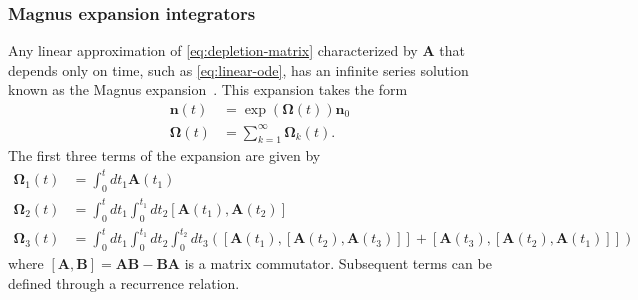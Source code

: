\documentclass[3p,authoryear]{elsarticle}
\newcommand{\vect}[1]{\mathbf{#1}} %
\begin{document}
\subsubsection{Magnus expansion integrators}

Any linear approximation of \cref{eq:depletion-matrix} characterized by
$\vect{A}$ that depends only on time, such as \cref{eq:linear-ode}, has an
infinite series solution known as the Magnus expansion~\citep{blanes2009pr}.
This expansion takes the form
\begin{equation}
  \begin{split}
  \vect{n}(t) &= \exp \left( \vect{\Omega}(t) \right ) \vect{n}_0 \\
  \vect{\Omega}(t) &= \sum\limits_{k=1}^\infty \vect{\Omega}_k(t).
  \end{split}
\end{equation}
The first three terms of the expansion are given by
\begin{equation}
  \label{eq:magnus-terms}
  \begin{split}
    \vect{\Omega}_1(t) &= \int_0^t dt_1 \vect{A}(t_1) \\
    \vect{\Omega}_2(t) &= \int_0^t dt_1 \int_0^{t_1} dt_2 [\vect{A}(t_1), \vect{A}(t_2) ] \\
    \vect{\Omega}_3(t) &= \int_0^t dt_1 \int_0^{t_1} dt_2 \int_0^{t_2} dt_3
      \left ( [\vect{A}(t_1), [\vect{A}(t_2), \vect{A}(t_3)]] + [\vect{A}(t_3), [\vect{A}(t_2), \vect{A}(t_1)]] \right )
  \end{split}
\end{equation}
where $[\vect{A},\vect{B}] = \vect{A}\vect{B} - \vect{B}\vect{A}$ is a matrix
commutator. Subsequent terms can be defined through a recurrence relation.
\end{document}
